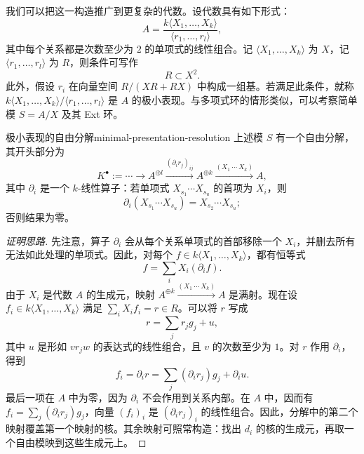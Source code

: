 我们可以把这一构造推广到更复杂的代数。设代数具有如下形式：
\[
  A=\frac{k\langle X_1,\ldots,X_k\rangle}{\langle r_1,\ldots,r_l\rangle},
\]
其中每个关系都是次数至少为 $2$ 的单项式的线性组合。记 $\langle X_1,\ldots,X_k\rangle$ 为 $X$，记 $\langle r_1,\ldots,r_l\rangle$ 为 $R$，则条件可写作
\[
  R\subset X^2.
\]
此外，假设 $r_i$ 在向量空间 $R/(XR+RX)$ 中构成一组基。若满足此条件，就称 $k\langle X_1,\ldots,X_k\rangle/\langle r_1,\ldots,r_l\rangle$ 是 $A$ 的极小表现。与多项式环的情形类似，可以考察简单模 $S=A/X$ 及其 Ext 环。

\begin{lemma}{极小表现的自由分解}{minimal-presentation-resolution}
上述模 $S$ 有一个自由分解，其开头部分为
\[
  K^\bullet:=\cdots\longrightarrow A^{\oplus l}
  \xrightarrow{(\partial_i r_j)_{ij}}A^{\oplus k}
  \xrightarrow{(X_1\ \cdots\ X_k)}A,
\]
其中 $\partial_i$ 是一个 $k$-线性算子：若单项式 $X_{s_1}\cdots X_{s_u}$ 的首项为 $X_i$，则
\[
  \partial_i(X_{s_1}\cdots X_{s_u})=X_{s_2}\cdots X_{s_u};
\]
否则结果为零。
\end{lemma}
\begin{proof}[证明思路]
先注意，算子 $\partial_i$ 会从每个关系单项式的首部移除一个 $X_i$，并删去所有无法如此处理的单项式。因此，对每个 $f\in k\langle X_1,\ldots,X_k\rangle$，都有恒等式
\[
  f=\sum_iX_i(\partial_i f).
\]
由于 $X_i$ 是代数 $A$ 的生成元，映射 $A^{\oplus k}\xrightarrow{(X_1\ \cdots\ X_k)}A$ 是满射。现在设 $f_i\in k\langle X_1,\ldots,X_k\rangle$ 满足 $\sum_iX_if_i=r\in R$。可以将 $r$ 写成
\[
  r=\sum_j r_jg_j+u,
\]
其中 $u$ 是形如 $vr_jw$ 的表达式的线性组合，且 $v$ 的次数至少为 $1$。对 $r$ 作用 $\partial_i$，得到
\[
  f_i=\partial_i r=\sum_j(\partial_i r_j)g_j+\partial_i u.
\]
最后一项在 $A$ 中为零，因为 $\partial_i$ 不会作用到关系内部。在 $A$ 中，因而有 $f_i=\sum_j(\partial_i r_j)g_j$，向量 $(f_i)_i$ 是 $(\partial_i r_j)_i$ 的线性组合。因此，分解中的第二个映射覆盖第一个映射的核。其余映射可照常构造：找出 $d_i$ 的核的生成元，再取一个自由模映到这些生成元上。
\end{proof}

